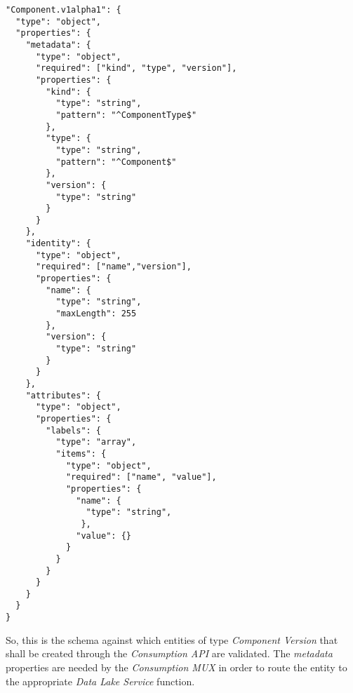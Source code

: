\begin{lstlisting}[basicstyle=\tiny, caption=Component Version Schema, captionpos=b, label=lst:ComponentVersionSchema]
"Component.v1alpha1": {
  "type": "object",
  "properties": {
    "metadata": {
      "type": "object",
      "required": ["kind", "type", "version"],
      "properties": {
      	"kind": {
      	  "type": "string",
      	  "pattern": "^ComponentType$"
      	},
        "type": {
          "type": "string",
          "pattern": "^Component$"
        },
        "version": {
          "type": "string"
        }
      }
    },
    "identity": {
      "type": "object",
      "required": ["name","version"],
      "properties": {
        "name": {
          "type": "string",
          "maxLength": 255
        },
        "version": {
          "type": "string"
        }
      }
    },
    "attributes": {
      "type": "object",
      "properties": {
        "labels": {
          "type": "array",
          "items": {
            "type": "object",
            "required": ["name", "value"],
            "properties": {
              "name": {
                "type": "string",
               },
              "value": {}
            }
          }  
        } 
      }
    }
  }
}
\end{lstlisting}

So, this is the schema against which entities of type \emph{Component Version} that shall be created through the \emph{Consumption API} are validated. The \emph{metadata} properties are needed by the \emph{Consumption MUX} in order to route the entity to the appropriate \emph{Data Lake Service} function.\\

